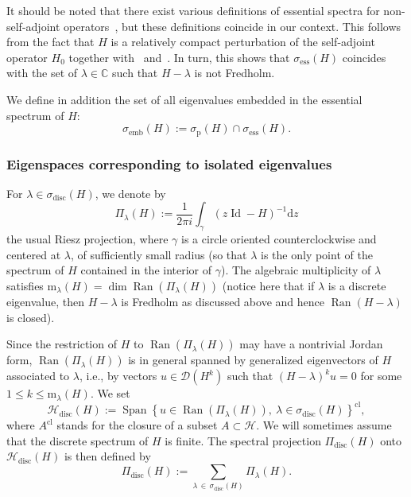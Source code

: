 \documentclass[AHL,Unicode,longabstracts,published]{cedram}
\newcommand{\Hi}{\mathcal{H}}
\newcommand{\bbC}{\mathbb{C}}
\newcommand{\ess}{\mathrm{ess}}
\newcommand{\rmp}{\mathrm{p}}
\newcommand{\rmd}{\mathrm{d}}
\newcommand{\rmm}{\mathrm{m}}
\newcommand{\disc}{\mathrm{disc}}
\newcommand{\clD}{\mathcal{D}}
\DeclareMathOperator{\Ran}{Ran}
\DeclareMathOperator{\Id}{Id}
\DeclareMathOperator{\Span}{Span}
\newcommand*\bbC{\mathbb{C}}
\newcommand{\Hi}{\mathcal{H}}
\newcommand{\rmp}{\mathrm{p}}
\newcommand{\ess}{\mathrm{ess}}
\begin{document}
It should be noted that there exist various definitions of essential spectra for non-self-adjoint operators~\cite[Chapter~IX]{EdEv87_01}, but these definitions coincide in our context. This follows from the fact that $H$ is a relatively compact perturbation of the self-adjoint operator $H_0$ together with~\cite[Corollary~2 of Theorem~XIII.14]{ReSi80_01} and~\cite[Theorems~IX.1.6 and IX.2.1]{EdEv87_01}. In turn, this shows that $\sigma_{\ess}(H)$ coincides with the set of $\lambda\in\bbC$ such that $H-\lambda$ is not Fredholm.

We define in addition the set of all eigenvalues embedded in the essential spectrum of $H$:
\begin{equation*}
\sigma_{\mathrm{emb}}(H):=\sigma_{\rmp}(H)\cap\sigma_{\ess}(H).
\end{equation*}



\subsubsection{Eigenspaces corresponding to isolated eigenvalues}\label{subsubsec:isolated}

For $\lambda\in\sigma_\disc(H)$, we denote by
\begin{equation}\label{eq:Projection_de_Riesz_def_pour_H}
\Pi_\lambda(H):=\frac{1}{2\pi i}\int_\gamma \left(z\Id-H\right)^{-1}\rmd z
\end{equation}
the usual Riesz projection, where $\gamma$ is a circle oriented counterclockwise and centered at $\lambda$, of sufficiently small radius (so that $\lambda$ is the only point of the spectrum of $H$ contained in the interior of $\gamma$). The algebraic multiplicity of $\lambda$ satisfies $\rmm_\lambda(H)=\dim\Ran(\Pi_\lambda(H))$ (notice here that if $\lambda$ is a discrete eigenvalue, then $H-\lambda$ is Fredholm as discussed above and hence $\Ran(H-\lambda)$ is closed).

Since the restriction of $H$ to $\Ran(\Pi_\lambda(H))$ may have a nontrivial Jordan form, $\Ran(\Pi_\lambda(H))$ is in general spanned by generalized eigenvectors of $H$ associated to $\lambda$, i.e., by vectors $u\in\clD(H^k)$ such that $(H-\lambda)^{k}u=0$ for some $1\leq k\leq \rmm_\lambda(H)$. We set
\begin{equation*}
\Hi_\disc(H):=\Span\left\lbrace u\in\Ran(\Pi_\lambda(H)),~\lambda\in\sigma_\disc(H)\right\rbrace^{\mathrm{cl}},
\end{equation*}
where $A^{\mathrm{cl}}$ stands for the closure of a subset $A\subset\Hi$. We will sometimes assume that the discrete spectrum of $H$ is finite. The spectral projection $\Pi_{\disc}(H)$ onto $\Hi_\disc(H)$ is then defined by
\begin{equation}\label{eq:def_Pi_disc}
\Pi_{\disc}(H):=\sum_{\lambda\,\in\,\sigma_{\disc}(H)}\Pi_\lambda(H).
\end{equation}
\end{document}
